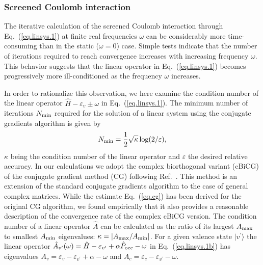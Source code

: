 \documentclass[twocolumn,prb,showpacs,superscriptaddress]{revtex4}
\def\w{\omega}
\def\>{\rangle}
\def\<{\langle}
\def\H{\hat{H}}
\def\P{\hat{P}_{\rm occ}}
\def\E{\varepsilon}
\def\vp{{v^\prime}}
\begin{document}
\subsubsection{Screened Coulomb interaction}

The iterative calculation of the screened Coulomb interaction through 
Eq.\ (\ref{eq.linsys.1}) at finite real
frequencies $\w$ can be considerably more time-consuming than in the static
($\w\!=\!0$) case. Simple tests indicate that 
the number of iterations required to reach convergence increases with 
increasing frequency $\w$. This behavior suggests that the linear operator in
Eq.\ (\ref{eq.linsys.1}) becomes progressively more ill-conditioned 
as the frequency $\w$ increases.

In order to rationalize this observation, we here examine
the condition number of the linear operator $\H-\E_v\pm\w$ in Eq.\ (\ref{eq.linsys.1}).
The minimum number of iterations $N_{\rm min}$ required for the solution of
a linear system using the conjugate gradients algorithm is given by
  \begin{equation}\label{eq.cg}
  N_{\rm min} = \frac{1}{2}\sqrt{\kappa} \log(2/\varepsilon),
  \end{equation}
$\kappa$ being the condition number of the linear operator and $\varepsilon$ the
desired relative accuracy.\cite{painless.cg} In our calculations we adopt the 
complex biorthogonal variant (cBiCG) of the conjugate gradient method (CG)
following Ref.\ . This method is an extension of the standard 
conjugate gradients algorithm to the 
case of general complex matrices. While the estimate Eq.\ (\ref{eq.cg}) has
been derived for the original CG algorithm, we found empirically that it also 
provides a reasonable description of the convergence rate of the complex cBiCG version.
%
The condition number of a linear operator $\hat{A}$ can be calculated as the ratio 
of its largest $A_{\rm max}$ to smallest $A_{\rm min}$ eigenvalues: 
$\kappa=|A_{\rm max}/A_{\rm min}|$.
For a given valence state 
$|v^\prime\>$ the linear operator $\hat{A}_\vp (\w) = \H - \E_\vp + \alpha \P - \w$ 
in Eq.\ (\ref{eq.linsys.1b}) has eigenvalues
$A_v = \E_v - \E_\vp + \alpha - \w$ and $A_c = \E_c - \E_\vp - \w$. 
\end{document}
